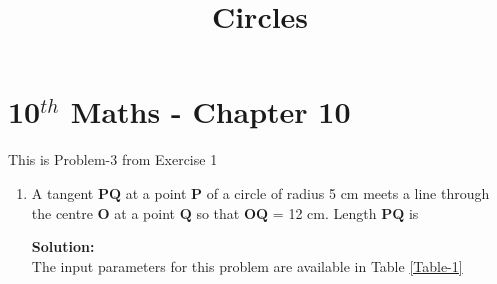 \documentclass[12pt]{article}
\newcommand{\solution}{\noindent \textbf{Solution: }}
\let\vec\mathbf
\begin{document}
\begin{center}
\enlargethispage{-4cm}
\title{\textbf{Circles}}
\date{\vspace{-5ex}} %
\maketitle
\end{center}
\setcounter{page}{1}
\section*{10$^{th}$ Maths - Chapter 10}
This is Problem-3 from Exercise 1
\begin{enumerate}
	\item A tangent $\vec{PQ}$ at a point $\vec{P}$ of a circle of radius 5 cm meets a line through the centre $\vec{O}$ at a point $\vec{Q}$ so that $\vec{OQ}$ = 12 cm. Length $\vec{PQ}$ is

\solution \\The input parameters for this problem are available in Table \eqref{Table-1}
\begin{table}[ht!]\centering

\caption{}
\label{Table-1}	
\end{table}


\end{enumerate}
\end{document}
